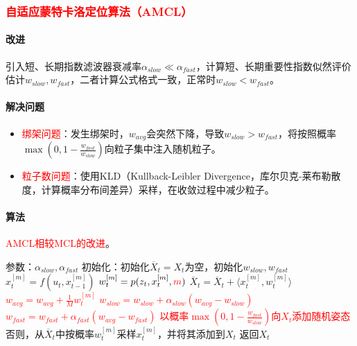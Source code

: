 \documentclass[
12pt, %
a4paper, 
oneside, %
]{scrartcl}
\begin{document}
\subsubsection[自适应蒙特卡洛定位算法]{\textcolor{red}{自适应蒙特卡洛定位算法（AMCL）}}
\paragraph{改进}
引入短、长期指数滤波器衰减率$ \alpha_{slow} \ll \alpha_{fast} $，计算短、长期重要性指数似然评价估计$ w_{slow}, w_{fast} $，二者计算公式格式一致，正常时$ w_{slow} < w_{fast} $。
\paragraph{解决问题}
\begin{itemize}
\item \textcolor{red}{绑架问题}：发生绑架时，$ w_{avg} $会突然下降，导致$ w_{slow} > w_{fast} $，将按照概率$ \max(0, 1 - \frac{w_{fast}}{w_{slow}}) $向粒子集中注入随机粒子。
\item \textcolor{red}{粒子数问题}：使用KLD（Kullback-Leibler Divergence，库尔贝克-莱布勒散度，计算概率分布间差异）采样，在收敛过程中减少粒子。
\end{itemize}
\paragraph{算法}
\textcolor{red}{AMCL相较MCL的改进}。
\begin{myalgorithm}[AMCL]
\State 参数：$ \alpha_{slow}, \alpha_{fast} $
\State 初始化：初始化$ \overline{X}_t = X_t $为空，初始化$ w_{slow}, w_{fast} $
\State $ x_t^{[m]} = f(u_t, x_{t - 1}^{[m]}) $
\State $ w_t^{[m]} = p(z_t, x_t^{[m]}, \textcolor{red}{m}) $
\State $ \overline{X}_t = \overline{X}_t + \langle x_t^{[m]}, w_t^{[m]} \rangle $
\State \textcolor{red}{$ w_{avg} = w_{avg} + \frac{1}{M} w_t^{[m]} $} 
\EndFor
\State \textcolor{red}{$ w_{slow} = w_{slow} + \alpha_{slow}(w_{avg} - w_{slow}) $} 
\State \textcolor{red}{$ w_{fast} = w_{fast} + \alpha_{fast}(w_{avg} - w_{fast}) $} 
\State \textcolor{red}{以概率$ \max(0, 1 - \frac{w_{fast}}{w_{slow}}) $向$ X_t $添加随机姿态} 
\State 否则，从$ \overline{X}_t $中按概率$ w_t^{[m]} $采样$ x_t^{[m]} $，并将其添加到$ X_t $ 
\EndFor
\State 返回$ X_t $
\end{myalgorithm}
\end{document}

